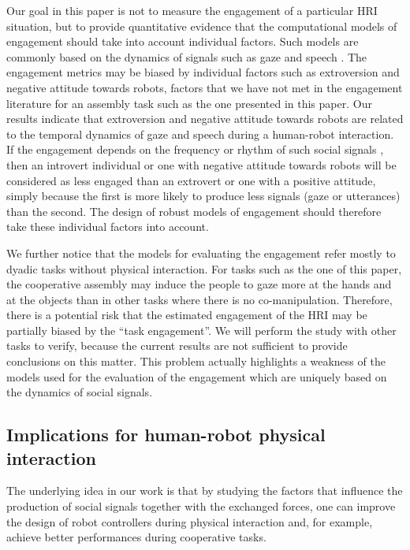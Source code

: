 Our goal in this paper is not to measure the engagement of a particular HRI situation, but to provide quantitative evidence that the computational models of engagement should take into account individual factors. Such models are commonly based on the dynamics of signals such as gaze and speech \cite{Anzalone2015engagement,sidner2004,rich2010recognizing}.
The engagement metrics may be biased by individual factors such as extroversion and negative attitude towards robots, factors that we have not met in the engagement literature for an assembly task such as the one presented in this paper.
Our results indicate that extroversion and negative attitude towards robots are related to the temporal dynamics of gaze and speech during a human-robot interaction.
If the engagement depends on the frequency or rhythm of such social signals \cite{rich2010recognizing}, then an introvert individual or one with negative attitude towards robots will be considered as less engaged than an extrovert or one with a positive attitude, simply because the first is more likely to produce less signals (gaze or utterances) than the second.
The design of robust models of engagement should therefore take these individual factors into account.

We further notice that the models for evaluating the engagement refer mostly to dyadic tasks without physical interaction. For tasks such as the one of this paper, the cooperative assembly may induce the people to gaze more at the hands and at the objects than in other tasks where there is no co-manipulation. 
Therefore, there is a potential risk that the estimated engagement of the HRI may be partially biased by the ``task engagement''. We will perform the study with other tasks to verify, because the current results are not sufficient to provide conclusions on this matter.
This problem actually highlights a weakness of the models used for the evaluation of the engagement which are uniquely based on the dynamics of social signals.


\subsection{Implications for human-robot physical interaction}

The underlying idea in our work is that by studying the factors that influence the production of social signals together with the exchanged forces, one can improve the design of robot controllers during physical interaction and, for example, achieve better performances during cooperative tasks.

